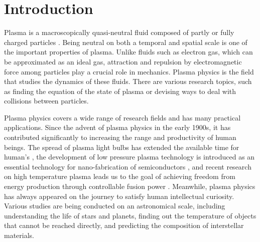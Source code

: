 
\chapter{Introduction}
\label{sec:ch1}

Plasma is a macroscopically quasi-neutral fluid composed of partly or fully charged particles \cite{langmuir1928oscillations, bellan2008fundamentals}. Being neutral on both a temporal and spatial scale is one of the important properties of plasma. Unlike fluids such as electron gas, which can be approximated as an ideal gas, attraction and repulsion by electromagnetic force among particles play a crucial role in mechanics. Plasma physics is the field that studies the dynamics of these fluids. There are various research topics, such as finding the equation of the state of plasma or devising ways to deal with collisions between particles.

Plasma physics covers a wide range of research fields and has many practical applications. Since the advent of plasma physics in the early 1900s, it has contributed significantly to increasing the range and productivity of human beings. The spread of plasma light bulbs has extended the available time for human's \cite{de1986high}, the development of low pressure plasma technology is introduced as an essential technology for nano-fabrication of semiconductors \cite{donnelly2013plasma}, and recent research on high temperature plasma leads us to the goal of achieving freedom from energy production through controllable fusion power \cite{mukhovatov1971plasma, fisch1978confining, kwon2011overview}. Meanwhile, plasma physics has always appeared on the journey to satisfy human intellectual curiosity. Various studies are being conducted on an astronomical scale, including understanding the life of stars and planets, finding out the temperature of objects that cannot be reached directly, and predicting the composition of interstellar materials.

